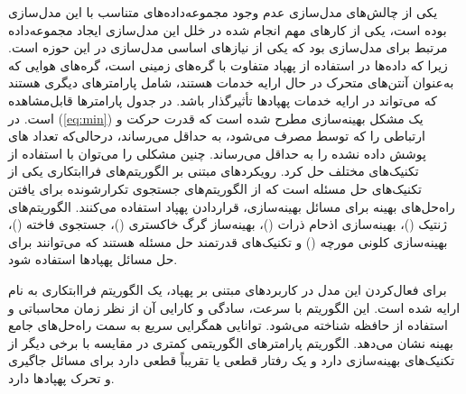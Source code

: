 یکی از چالش‌های مدل‌سازی عدم وجود مجموعه‌داده‌های متناسب با این مدل‌سازی بوده است، یکی از کارهای مهم انجام شده در خلل این مدل‌سازی ایجاد مجموعه‌داده مرتبط برای مدل‌سازی بود که یکی از نیازهای اساسی مدل‌سازی در این حوزه است. زیرا که داده‌ها در استفاده از پهپاد متفاوت با گره‌های زمینی است، گره‌های هوایی که به‌عنوان آنتن‌های متحرک در حال ارایه خدمات هستند، شامل پارامترهای دیگری هستند که می‌تواند در ارایه خدمات پهپادها تأثیرگذار باشد. در جدول پارامترها قابل‌مشاهده است.
در (\autoref{eq:min}) یک مشکل بهینه‌سازی  مطرح شده است که قدرت حرکت و ارتباطی را که توسط  مصرف می‌شود، به حداقل می‌رساند، درحالی‌که تعداد های پوشش داده نشده را به حداقل می‌رساند. چنین مشکلی را می‌توان با استفاده از تکنیک‌های مختلف حل کرد. رویکردهای مبتنی بر الگوریتم‌های فراابتکاری یکی از تکنیک‌های حل مسئله است که از الگوریتم‌های جستجوی تکرارشونده برای یافتن راه‌حل‌های بهینه برای مسائل بهینه‌سازی، قراردادن پهپاد استفاده می‌کنند. الگوریتم‌های ژنتیک ()، بهینه‌سازی اذحام ذرات ()، بهینه‌ساز گرگ خاکستری ()، جستجوی فاخته ()، بهینه‌سازی کلونی مورچه () و  تکنیک‌های قدرتمند حل مسئله هستند که می‌توانند برای حل مسائل پهپادها استفاده شود.

برای فعال‌کردن این مدل در کاربردهای مبتنی بر پهپاد، یک الگوریتم فراابتکاری به نام  ارایه شده است. این الگوریتم با سرعت، سادگی و کارایی آن از نظر زمان محاسباتی و استفاده از حافظه شناخته می‌شود.  توانایی همگرایی سریع به سمت راه‌حل‌های جامع بهینه نشان می‌دهد. الگوریتم  پارامترهای الگوریتمی کمتری در مقایسه با برخی دیگر از تکنیک‌های بهینه‌سازی دارد و یک رفتار قطعی یا تقریباً قطعی دارد برای مسائل جاگیری و تحرک پهپادها دارد.

